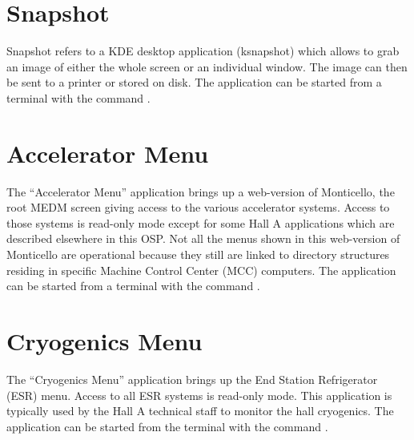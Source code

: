 {\section{Snapshot}
Snapshot refers to a KDE desktop application (ksnapshot) which allows to grab an image
of either the whole
screen or an individual window. The image can then be sent to a printer or stored on disk.
The application can be started from a terminal with the command .

\section{Accelerator Menu}
The ``Accelerator Menu'' application brings up a web-version of Monticello,
the root MEDM screen giving access to the various accelerator systems. Access to those
systems is read-only mode except for some Hall A applications which are described elsewhere
in this OSP. Not all the menus shown in this web-version of Monticello are operational
because they still are linked to directory structures residing in specific
Machine Control Center (MCC) computers. The application can be started from a terminal with
the command .

\section{Cryogenics Menu}
The ``Cryogenics Menu'' application brings up the End Station
Refrigerator (ESR) menu. Access to all ESR systems is read-only mode. This application
is typically used by the Hall A technical staff to
monitor the hall cryogenics. The application can be started from the terminal with the command .


}
